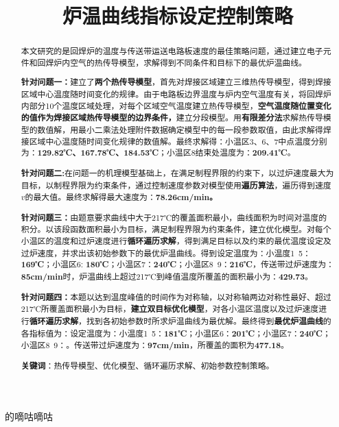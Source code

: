 \documentclass[withoutpreface,bwprint]{cumcmthesis} %
\title{炉温曲线指标设定控制策略}
\numberwithin{equation}{subsection}
\begin{document}
的嘀咕嘀咕

 \maketitle
 \begin{abstract}
本文研究的是回焊炉的温度与传送带运送电路板速度的最佳策略问题，通过建立电子元件和回焊炉内空气的热传导模型，求解得到不同条件和目标下的最优炉温曲线。

\textbf{针对问题一：}建立了\textbf{两个热传导模型}，首先对焊接区域建立三维热传导模型，得到焊接区域中心温度随时间变化的规律。由于电路板边界温度与炉内空气温度有关，将回焊炉内部分10个温度区域处理，对每个区域空气温度建立热传导模型，\textbf{空气温度随位置变化的值作为焊接区域热传导模型的边界条件，}建立分段模型。用\textbf{有限差分法}求解热传导模型的数值解，用最小二乘法处理附件数据确定模型中的每一段参数取值，由此求解得焊接区域中心温度随时间变化规律的数值解。最终求解得：小温区3、6、7中点温度分别为：\textbf{129.82℃、167.78℃、184.53℃}；小温区8结束处温度为：\textbf{209.41℃}。

\textbf{针对问题二:}在问题一的机理模型基础上，在满足制程界限的约束下，以过炉速度最大为目标，以制程界限为约束条件，通过控制速度参数对模型使用\textbf{遍历算法}，遍历得到速度$v$的最大值。最终求解得最大速度为：\textbf{78.26cm/min。}

\textbf{针对问题三：}由题意要求曲线中大于217℃的覆盖面积最小，曲线面积为时间对温度的积分。以该段函数面积最小为目标，满足制程界限为约束条件，建立优化模型。对每个小温区的温度和过炉速度进行\textbf{循环遍历求解}，得到满足目标以及约束的最优温度设定及过炉速度，并求出该初始参数下的最优炉温曲线。得到设定温度为：小温度1~5：\textbf{169℃}；小温区6: \textbf{180℃}；小温区7：\textbf{240℃}；小温区8~9：\textbf{216℃}，传送带过炉速度为：\textbf{85cm/min}时，炉温曲线上超过217℃到峰值温度所覆盖的面积最小为：\textbf{429.73}。

\textbf{针对问题四：}本题以达到温度峰值的时间作为对称轴，以对称轴两边对称性最好、超过217℃所覆盖面积最小为目标，\textbf{建立双目标优化模型}，对各小温区温度以及过炉速度进行\textbf{循环遍历求解}，找到各初始参数时所求炉温曲线为最优解。最终得到\textbf{最优炉温曲线}的各指标值为：设定温度为：小温度1~5：\textbf{181℃}；小温区6：\textbf{201℃}；小温区7：\textbf{240℃}；小温区8~9：。传送带过炉速度为：\textbf{97cm/min}，所覆盖的面积为\textbf{477.18}。

\textbf{关键词}：热传导模型、优化模型、循环遍历求解、初始参数控制策略。
\end{abstract}
\end{document}
